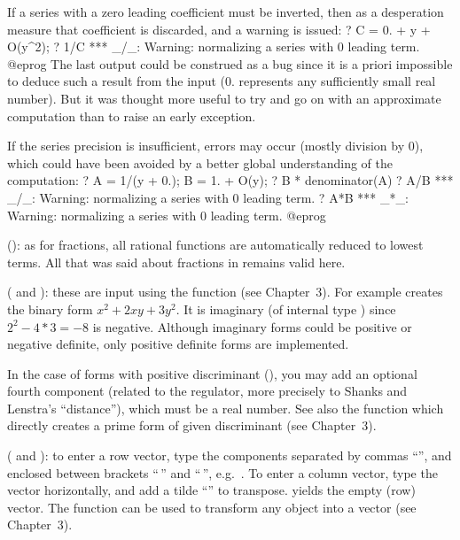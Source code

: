 If a series with a zero leading coefficient must be inverted, then as a
desperation measure that coefficient is discarded, and a warning is issued:
\bprog
? C = 0. + y + O(y^2);
? 1/C
  *** _/_: Warning: normalizing a series with 0 leading term.
@eprog\noindent
The last output could be construed as a bug since it is a priori impossible
to deduce such a result from the input ($0.$ represents any sufficiently
small real number). But it was thought more useful to try and go on with an
approximate computation than to raise an early exception.

If the series precision is insufficient, errors may occur (mostly division
by $0$), which could have been avoided by a better global understanding of
the computation:
\bprog
? A = 1/(y + 0.); B = 1. + O(y);
? B * denominator(A)
? A/B
  *** _/_: Warning: normalizing a series with 0 leading term.
? A*B
  *** _*_: Warning: normalizing a series with 0 leading term.
@eprog

(): as for fractions, all rational
functions are automatically reduced to lowest terms. All that was
said about fractions in  remains valid here.

%
( and ):
these are input using the function  (see Chapter~3). For example
 creates the binary form $x^2+2xy+3y^2$. It is imaginary (of
internal type ) since $2^2 - 4*3 = -8$ is negative. Although
imaginary forms could be positive or negative definite, only positive
definite forms are implemented.

In the case of forms with positive discriminant (), you may add
an optional fourth component (related to the regulator, more precisely to
Shanks and Lenstra's ``distance''), which must be a real number. See also the
function  which directly creates a prime form of given
discriminant (see Chapter~3).

( and ): to enter a row vector, type the components
separated by commas ``\kbd{,}'', and enclosed between brackets
``\kbd{[}$\,$'' and ``$\,$\kbd{]}'', e.g.~\kbd{[1,2,3]}. To enter a column
vector, type the vector horizontally, and add a tilde ``\til'' to transpose.
\kbd{[ ]} yields the empty (row) vector. The function  can be used
to transform any object into a vector (see Chapter~3).

